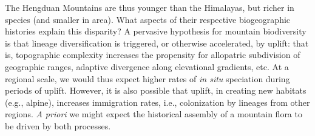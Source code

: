 The Hengduan Mountains are thus younger than the Himalayas, but richer in species (and smaller in area). What aspects of their respective biogeographic histories explain this disparity? A pervasive hypothesis for mountain biodiversity is that lineage diversification is triggered, or otherwise accelerated, by uplift: that is, topographic complexity increases the propensity for allopatric subdivision of geographic ranges, adaptive divergence along elevational gradients, etc. At a regional scale, we would thus expect higher rates of \textit{in situ} speciation during periods of uplift. However, it is also possible that uplift, in creating new habitats (e.g., alpine), increases immigration rates, i.e., colonization by lineages from other regions. \textit{A priori} we might expect the historical assembly of a mountain flora to be driven by both processes.





